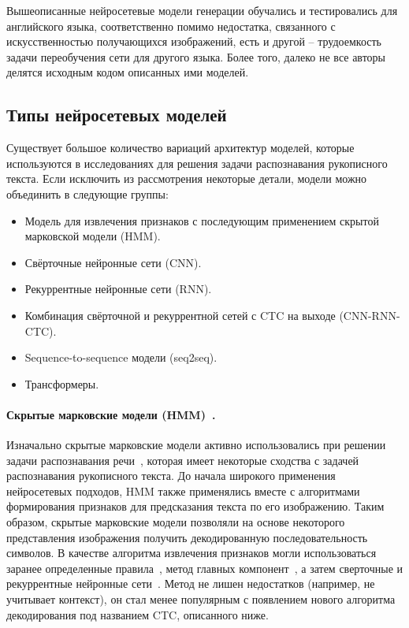 Вышеописанные нейросетевые модели генерации обучались и тестировались для английского языка, соответственно помимо недостатка,
связанного с искусственностью получающихся изображений, есть и другой -- трудоемкость задачи переобучения сети для другого языка.
Более того, далеко не все авторы делятся исходным кодом описанных ими моделей.


\subsection{Типы нейросетевых моделей}
\label{subsec:networks-description}

Существует большое количество вариаций архитектур моделей, которые используются в исследованиях для решения задачи распознавания рукописного текста.
Если исключить из рассмотрения некоторые детали, модели можно объединить в следующие группы:
\begin{itemize}
    \item Модель для извлечения признаков с последующим применением скрытой марковской модели (HMM).
    \item Свёрточные нейронные сети (CNN).
    \item Рекуррентные нейронные сети (RNN).
    \item Комбинация свёрточной и рекуррентной сетей с CTC на выходе (CNN-RNN-CTC).
    \item Sequence-to-sequence модели (seq2seq).
    \item Трансформеры.
\end{itemize}

\paragraph{Скрытые марковские модели (HMM)~\cite{rabiner1986introduction}.}{
    Изначально скрытые марковские модели активно использовались при решении задачи распознавания речи~\cite{trentin2001survey},
    которая имеет некоторые сходства с задачей распознавания рукописного текста.
    До начала широкого применения нейросетевых подходов, HMM также применялись вместе с алгоритмами формирования признаков для предсказания текста по его изображению.
    Таким образом, скрытые марковские модели позволяли на основе некоторого представления изображения получить декодированную последовательность символов.
    В качестве алгоритма извлечения признаков могли использоваться заранее определенные правила~\cite{bertolami2008hidden},
    метод главных компонент~\cite{dreuw2011confidence}, а затем сверточные и рекуррентные нейронные сети~\cite{bluche2013tandem, bluche2014comparison}.
    Метод не лишен недостатков (например, не учитывает контекст), он стал менее популярным с появлением нового алгоритма декодирования под названием CTC, описанного ниже.
}

